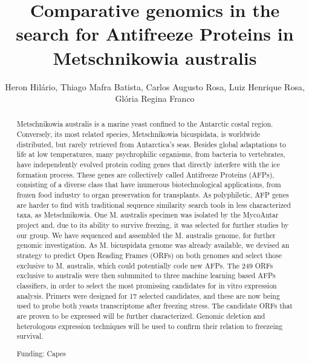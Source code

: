 \documentclass[twoside]{article}
\title{\vspace{-15mm}\fontsize{24pt}{10pt}\selectfont\textbf{ Comparative genomics in the search for Antifreeze Proteins in Metschnikowia australis }} %
\author{ Heron Hil\'ario, Thiago Mafra Batista, Carlos Augusto Rosa, Luiz Henrique Rosa, Gl\'oria Regina Franco }
\affil{ Universidade Federal do Sul da Bahia }
\date{}
\begin{document}
  
  
  \maketitle %
  
  
  \thispagestyle{fancy} %
  
  
  \begin{abstract}
  Metschnikowia australis is a marine yeast confined to the Antarctic costal region. Conversely,  its most related species,  Metschnikowia bicuspidata,  is worldwide distributed,  but rarely retrieved from Antarctica’s seas. Besides global adaptations to life at low temperatures,  many psychrophilic organisms,  from bacteria to vertebrates,  have independently evolved protein coding genes that directly interfere with the ice formation process. These genes are collectively called Antifreeze Proteins (AFPs),  consisting of a diverse class that have inumerous biotechnological applications,  from frozen food industry to organ preservation for transplants. As polyphiletic,  AFP genes are harder to find with traditional sequence similarity search tools in less characterized taxa,  as Metschnikowia. One M. australis specimen was isolated by the MycoAntar project and,  due to its ability to survive freezing,  it was selected for further studies by our group. We have sequenced and assembled the M. australis genome,  for further genomic investigation. As M. bicuspidata genome was already available,  we devised an strategy to predict Open Reading Frames (ORFs) on both genomes and select those exclusive to M. australis,  which could potentially code new AFPs. The 249 ORFs exclusive to australis were then submmited to three machine learning based AFPs classifiers,  in order to select the most promissing candidates for in vitro expression analysis. Primers were designed for 17 selected candidates,  and these are now being used to probe both yeasts transcriptome after freezing stress. The candidate ORFs that are proven to be expressed will be further characterized. Genomic deletion and heterologous expression techniques will be used to confirm their relation to freezeing survival.
  
  Funding: Capes \\ 
  \end{abstract}
  
\end{document}
